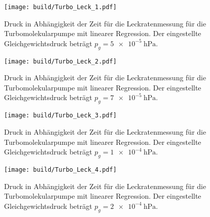 \begin{figure}[H]
    \centering
    \texttt{[image: build/Turbo\_Leck\_1.pdf]}
    \caption{Druck in Abhängigkeit der Zeit für die Leckratenmessung für die Turbomolekularpumpe mit linearer Regression. Der eingestellte Gleichgewichtsdruck beträgt $p_g=\SI{5e-5}{\hecto\pascal}$.}
    \label{fig:turbo_leck1}
\end{figure}
\noindent
\begin{figure}[H]
    \centering
    \texttt{[image: build/Turbo\_Leck\_2.pdf]}
    \caption{Druck in Abhängigkeit der Zeit für die Leckratenmessung für die Turbomolekularpumpe mit linearer Regression. Der eingestellte Gleichgewichtsdruck beträgt $p_g=\SI{7e-5}{\hecto\pascal}$.}
    \label{fig:turbo_leck2}
\end{figure}
\noindent
\begin{figure}[H]
    \centering
    \texttt{[image: build/Turbo\_Leck\_3.pdf]}
    \caption{Druck in Abhängigkeit der Zeit für die Leckratenmessung für die Turbomolekularpumpe mit linearer Regression. Der eingestellte Gleichgewichtsdruck beträgt $p_g=\SI{1e-4}{\hecto\pascal}$.}
    \label{fig:turbo_leck3}
\end{figure}
\noindent
\begin{figure}[H]
    \centering
    \texttt{[image: build/Turbo\_Leck\_4.pdf]}
    \caption{Druck in Abhängigkeit der Zeit für die Leckratenmessung für die Turbomolekularpumpe mit linearer Regression. Der eingestellte Gleichgewichtsdruck beträgt $p_g=\SI{2e-4}{\hecto\pascal}$.}
    \label{fig:turbo_leck4}
\end{figure}
\noindent